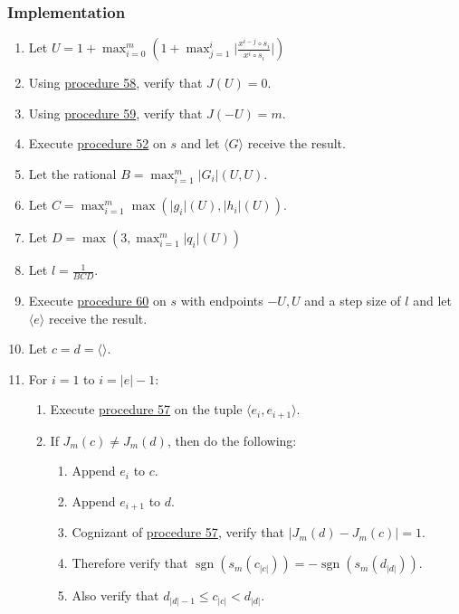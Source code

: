 \documentclass[twocolumn]{article}
\DeclareMathOperator{\sgn}{sgn}
\begin{document}
			\subsubsection{Implementation}
				\begin{enumerate}
					\item Let $U=1+\max_{i=0}^m\left(1+\max_{j=1}^i\lvert\frac{x^{i-j}\circ s_i}{x^i\circ s_i}\rvert\right)$
					\item Using \hyperref[sec:procedure 58]{procedure 58}, verify that $J(U)=0$.
					\item Using \hyperref[sec:procedure 59]{procedure 59}, verify that $J(-U)=m$.
					\item Execute \hyperref[sec:procedure 52]{procedure 52} on $s$ and let $\langle G\rangle$ receive the result.
					\item Let the rational $B=\max_{i=1}^m \lvert G_i\rvert(U,U)$.
					\item Let $C=\max_{i=1}^m \max(\lvert g_i\rvert(U),\lvert h_i\rvert(U))$.
					\item Let $D=\max(3, \max_{i=1}^m \lvert q_i\rvert(U))$
					\item Let $l=\frac{1}{BCD}$.
					\item Execute \hyperref[sec:procedure 60]{procedure 60} on $s$ with endpoints $-U,U$ and a step size of $l$ and let $\langle e\rangle$ receive the result.
					\item Let $c=d=\langle\rangle$.
					\item For $i=1$ to $i=\lvert e\rvert-1$:
					\begin{enumerate}
						\item Execute \hyperref[sec:procedure 57]{procedure 57} on the tuple $\langle e_i,e_{i+1}\rangle$.
						\item If $J_m(c)\ne J_m(d)$, then do the following:
						\begin{enumerate}
							\item Append $e_i$ to $c$.
							\item Append $e_{i+1}$ to $d$.
							\item Cognizant of \hyperref[sec:procedure 57]{procedure 57}, verify that $\lvert J_m(d)-J_m(c)\rvert=1$.
							\item Therefore verify that $\sgn(s_m(c_{\lvert c\rvert}))=-\sgn(s_m(d_{\lvert d\rvert}))$.
							\item Also verify that $d_{\lvert d\rvert-1}\le c_{\lvert c\rvert}<d_{\lvert d\rvert}$.
						\end{enumerate}
					\end{enumerate}

\end{enumerate}
\end{document}
